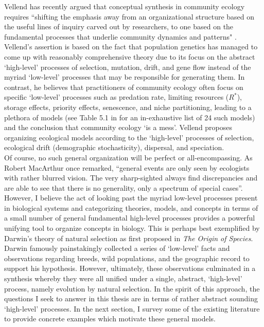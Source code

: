 Vellend has recently argued that conceptual synthesis in community ecology requires ``shifting the emphasis away from an organizational structure based on the useful lines of inquiry carved out by researchers, to one based on the fundamental processes that underlie community dynamics and patterns" \citep{vellend_theory_2016}. Vellend's assertion is based on the fact that population genetics has managed to come up with reasonably comprehensive theory due to its focus on the abstract `high-level' processes of selection, mutation, drift, and gene flow instead of the myriad `low-level' processes that may be responsible for generating them. In contrast, he believes that practitioners of community ecology often focus on specific `low-level' processes such as predation rate, limiting resources ($R^*$), storage effects, priority effects, senescence, and niche partitioning, leading to a plethora of models (see Table 5.1 in \citep{vellend_theory_2016} for an in-exhaustive list of 24 such models) and the conclusion that community ecology `is a mess'. Vellend proposes organizing ecological models according to the `high-level' processes of selection, ecological drift (demographic stochasticity), dispersal, and speciation.\\ Of course, no such general organization will be perfect or all-encompassing. As Robert MacArthur once remarked, ``general events are only seen by ecologists with rather blurred vision. The very sharp-sighted always find discrepancies and are able to see that there is no generality, only a spectrum of special cases”\citep{kingsland_modeling_1985}. However, I believe the act of looking past the myriad low-level processes present in biological systems and categorizing theories, models, and concepts in terms of a small number of general fundamental high-level processes provides a powerful unifying tool to organize concepts in biology. This is perhaps best exemplified by Darwin’s theory of natural selection as first proposed in \emph{The Origin of Species}. Darwin famously painstakingly collected a series of ‘low-level’ facts and observations regarding breeds, wild populations, and the geographic record to support his hypothesis. However, ultimately, these observations culminated in a synthesis whereby they were all unified under a single, abstract, ‘high-level’ process, namely evolution by natural selection.
In the spirit of this approach, the questions I seek to answer in this thesis are in terms of rather abstract sounding `high-level' processes. In the next section, I survey some of the existing literature to provide concrete examples which motivate these general models.

